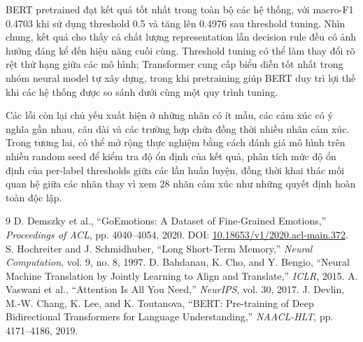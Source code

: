 \documentclass[12pt,a4paper]{article}
\begin{document}
BERT pretrained đạt kết quả tốt nhất trong toàn bộ các hệ thống, với macro-F1 0.4703 khi sử dụng threshold 0.5 và tăng lên 0.4976 sau threshold tuning. Nhìn chung, kết quả cho thấy cả chất lượng representation lẫn decision rule đều có ảnh hưởng đáng kể đến hiệu năng cuối cùng. Threshold tuning có thể làm thay đổi rõ rệt thứ hạng giữa các mô hình; Transformer cung cấp biểu diễn tốt nhất trong nhóm neural model tự xây dựng, trong khi pretraining giúp BERT duy trì lợi thế khi các hệ thống được so sánh dưới cùng một quy trình tuning.

Các lỗi còn lại chủ yếu xuất hiện ở những nhãn có ít mẫu, các cảm xúc có ý nghĩa gần nhau, câu dài và các trường hợp chứa đồng thời nhiều nhãn cảm xúc. Trong tương lai, có thể mở rộng thực nghiệm bằng cách đánh giá mô hình trên nhiều random seed để kiểm tra độ ổn định của kết quả, phân tích mức độ ổn định của per-label thresholds giữa các lần huấn luyện, đồng thời khai thác mối quan hệ giữa các nhãn thay vì xem 28 nhãn cảm xúc như những quyết định hoàn toàn độc lập.


\begin{thebibliography}{9}
 D. Demszky et al., ``GoEmotions: A Dataset of Fine-Grained Emotions,'' \textit{Proceedings of ACL}, pp. 4040--4054, 2020. DOI: \href{https://doi.org/10.18653/v1/2020.acl-main.372}{10.18653/v1/2020.acl-main.372}.
 S. Hochreiter and J. Schmidhuber, ``Long Short-Term Memory,'' \textit{Neural Computation}, vol. 9, no. 8, 1997.
 D. Bahdanau, K. Cho, and Y. Bengio, ``Neural Machine Translation by Jointly Learning to Align and Translate,'' \textit{ICLR}, 2015.
 A. Vaswani et al., ``Attention Is All You Need,'' \textit{NeurIPS}, vol. 30, 2017.
 J. Devlin, M.-W. Chang, K. Lee, and K. Toutanova, ``BERT: Pre-training of Deep Bidirectional Transformers for Language Understanding,'' \textit{NAACL-HLT}, pp. 4171--4186, 2019.
\end{thebibliography}
\end{document}
